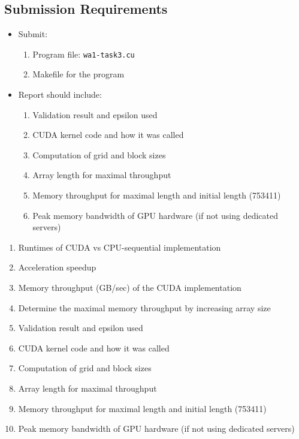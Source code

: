 \documentclass{article}
\begin{document}
\subsection{Submission Requirements}

\begin{itemize}
    \item Submit:
    \begin{enumerate}
        \item Program file: \texttt{wa1-task3.cu}
        \item Makefile for the program
    \end{enumerate}
    \item Report should include:
    \begin{enumerate}
        \item Validation result and epsilon used
        \item CUDA kernel code and how it was called
        \item Computation of grid and block sizes
        \item Array length for maximal throughput
        \item Memory throughput for maximal length and initial length (753411)
        \item Peak memory bandwidth of GPU hardware (if not using dedicated servers)
    \end{enumerate}
\end{itemize}

\begin{enumerate}
    \item Runtimes of CUDA vs CPU-sequential implementation
    \item Acceleration speedup
    \item Memory throughput (GB/sec) of the CUDA implementation
    \item Determine the maximal memory throughput by increasing array size
    \item Validation result and epsilon used
    \item CUDA kernel code and how it was called
    \item Computation of grid and block sizes
    \item Array length for maximal throughput
    \item Memory throughput for maximal length and initial length (753411)
    \item Peak memory bandwidth of GPU hardware (if not using dedicated servers)
\end{enumerate}
\end{document}
